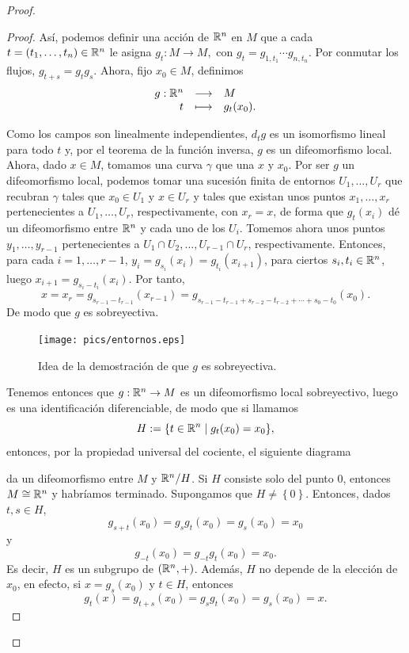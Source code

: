 \begin{proof}
\begin{proof}
  Así, podemos definir una acción de $\mathbb{R}^n$ en $M$ que a cada $t=(t_1,\dots,t_n)\in \mathbb{R}^n$ le asigna $g_t:M\rightarrow M,$ con $g_t=g_{1,t_1}\cdots g_{n,t_n}$.
Por conmutar los flujos, $g_{t+s}=g_t g_s$. Ahora, fijo $x_0 \in M$, definimos 
\[
  \begin{array}{rcl}
g:\mathbb{R}^n & \longrightarrow & M \\
t & \longmapsto & g_t (x_0).
\end{array}
\]

Como los campos son linealmente independientes, $d_t g$ es un isomorfismo lineal para todo $t$ y, por el teorema de la función inversa, $g$ es un difeomorfismo local. Ahora, dado $x\in M$, tomamos una curva $\gamma$ que una $x$ y $x_0$. Por ser $g$ un difeomorfismo local, podemos tomar una sucesión finita de entornos $U_1,\dots,U_r$ que recubran $\gamma$ tales que $x_0 \in U_1$ y $x \in U_r$ y tales que existan unos puntos $x_1,\dots,x_r$ pertenecientes a $U_1,\dots,U_r$, respectivamente, con $x_r=x$, de forma que $g_t(x_i)$ dé un difeomorfismo entre $\mathbb{R}^n$ y cada uno de los $U_i$. Tomemos ahora unos puntos $y_1,\dots,y_{r-1}$ pertenecientes a $U_1\cap U_2,\dots,U_{r-1}\cap U_r$, respectivamente. Entonces, para cada $i=1,\dots,r-1$, $y_i=g_{s_i}(x_i)=g_{t_i}(x_{i+1})$, para ciertos $s_i, t_i \in \mathbb{R}^n$, luego $x_{i+1}=g_{s_i-t_i}(x_i)$. Por tanto, 
$$x=x_{r}=g_{s_{r-1}-t_{r-1}}(x_{r-1})=g_{s_{r-1}-t_{r-1}+s_{r-2}-t_{r-2}+\cdots+s_0-t_0}(x_0).$$ De modo que $g$ es sobreyectiva.

\begin{figure}[h]
  \centering
  \texttt{[image: pics/entornos.eps]}
  \caption{\small Idea de la demostración de que $g$ es sobreyectiva.}
  \label{fig:entornos}
\end{figure}

Tenemos entonces que $g:\mathbb{R}^n\rightarrow M$ es un difeomorfismo local sobreyectivo, luego es una identificación diferenciable, de modo que si llamamos 
\[  
  H:=\{t \in \mathbb{R}^n \mid g_t(x_0)=x_0\},
\]
entonces, por la propiedad universal del cociente, el siguiente diagrama
\begin{center}
\end{center}
da un difeomorfismo entre $M$ y $\mathbb{R}^n/H$. Si $H$ consiste solo del punto $0$, entonces $M\cong \mathbb{R}^n$ y habríamos terminado. Supongamos que $H\neq\left\{ 0 \right\}$.
 Entonces, dados $t, s \in H$, 
\[
  g_{s+t}(x_0)=g_sg_t(x_0)=g_s(x_0)=x_0
\]
y 
\[
  g_{-t}(x_0)=g_{-t}g_t(x_0)=x_0.
\] 
Es decir, $H$ es un subgrupo de $(\mathbb{R}^n,+)$. Además, $H$ no depende de la elección de $x_0$, en efecto, si $x=g_s (x_0)$ y $t\in H$, entonces 
\[
  g_t (x) = g_{t+s}(x_0)=g_sg_t(x_0)=g_s(x_0)=x. 
 \] 


\end{proof}
\end{proof}
